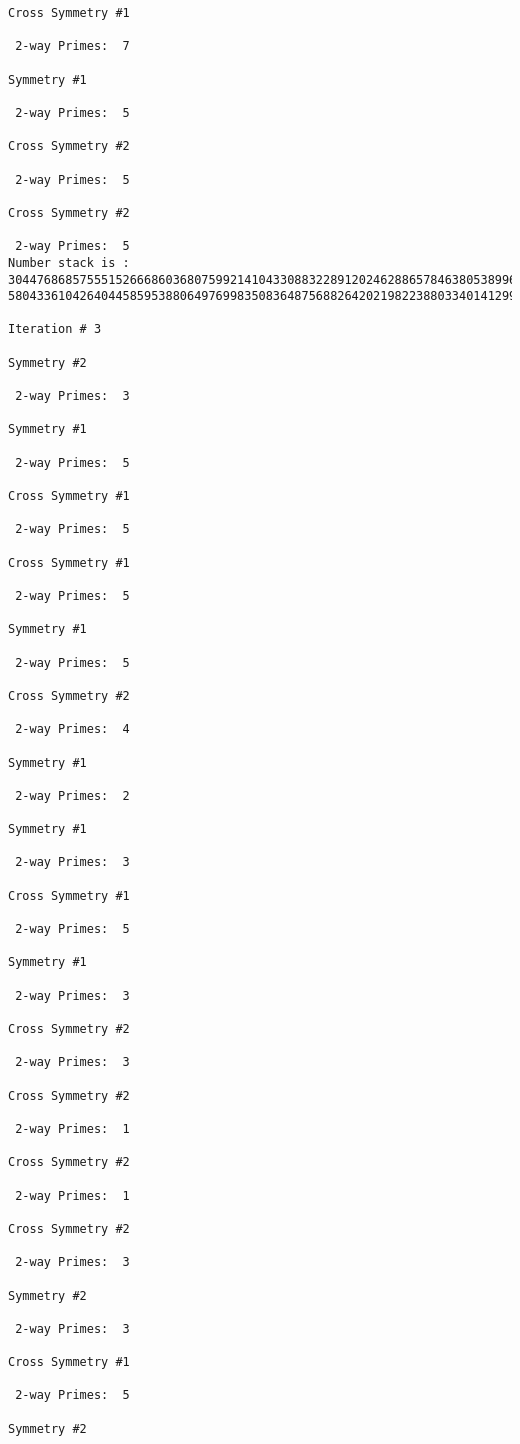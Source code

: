 \begin{verbatim}
Cross Symmetry #1

 2-way Primes: 	7

Symmetry #1

 2-way Primes: 	5

Cross Symmetry #2

 2-way Primes: 	5

Cross Symmetry #2

 2-way Primes: 	5
Number stack is :
30447686857555152666860368075992141043308832289120246288657846380538996794608835958544046240163340857
58043361042640445859538806497699835083648756882642021982238803340141299570863068666251555758686744037

Iteration #	3

Symmetry #2

 2-way Primes: 	3

Symmetry #1

 2-way Primes: 	5

Cross Symmetry #1

 2-way Primes: 	5

Cross Symmetry #1

 2-way Primes: 	5

Symmetry #1

 2-way Primes: 	5

Cross Symmetry #2

 2-way Primes: 	4

Symmetry #1

 2-way Primes: 	2

Symmetry #1

 2-way Primes: 	3

Cross Symmetry #1

 2-way Primes: 	5

Symmetry #1

 2-way Primes: 	3

Cross Symmetry #2

 2-way Primes: 	3

Cross Symmetry #2

 2-way Primes: 	1

Cross Symmetry #2

 2-way Primes: 	1

Cross Symmetry #2

 2-way Primes: 	3

Symmetry #2

 2-way Primes: 	3

Cross Symmetry #1

 2-way Primes: 	5

Symmetry #2


\end{verbatim}
